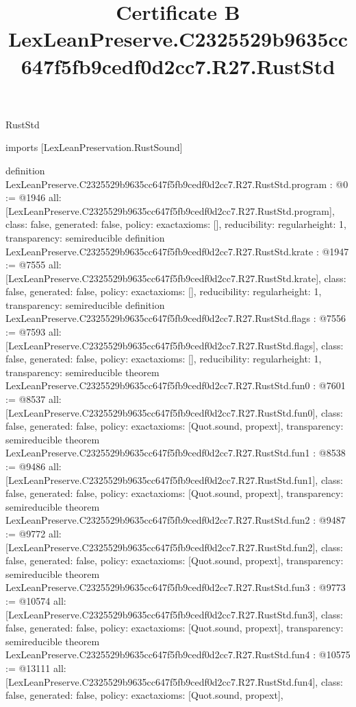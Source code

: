 \begin{lexlean}{RustStd}
\title{Certificate B LexLeanPreserve.C2325529b9635cc647f5fb9cedf0d2cc7.R27.RustStd}
\begin{coremodule}
imports [LexLeanPreservation.RustSound]

definition LexLeanPreserve.C2325529b9635cc647f5fb9cedf0d2cc7.R27.RustStd.program : @0 := @1946 {
  all: [LexLeanPreserve.C2325529b9635cc647f5fb9cedf0d2cc7.R27.RustStd.program],
  class: false,
  generated: false,
  policy: exact{axioms: []},
  reducibility: regular{height: 1},
  transparency: semireducible
}
definition LexLeanPreserve.C2325529b9635cc647f5fb9cedf0d2cc7.R27.RustStd.krate : @1947 := @7555 {
  all: [LexLeanPreserve.C2325529b9635cc647f5fb9cedf0d2cc7.R27.RustStd.krate],
  class: false,
  generated: false,
  policy: exact{axioms: []},
  reducibility: regular{height: 1},
  transparency: semireducible
}
definition LexLeanPreserve.C2325529b9635cc647f5fb9cedf0d2cc7.R27.RustStd.flags : @7556 := @7593 {
  all: [LexLeanPreserve.C2325529b9635cc647f5fb9cedf0d2cc7.R27.RustStd.flags],
  class: false,
  generated: false,
  policy: exact{axioms: []},
  reducibility: regular{height: 1},
  transparency: semireducible
}
theorem LexLeanPreserve.C2325529b9635cc647f5fb9cedf0d2cc7.R27.RustStd.fun0 : @7601 := @8537 {
  all: [LexLeanPreserve.C2325529b9635cc647f5fb9cedf0d2cc7.R27.RustStd.fun0],
  class: false,
  generated: false,
  policy: exact{axioms: [Quot.sound, propext]},
  transparency: semireducible
}
theorem LexLeanPreserve.C2325529b9635cc647f5fb9cedf0d2cc7.R27.RustStd.fun1 : @8538 := @9486 {
  all: [LexLeanPreserve.C2325529b9635cc647f5fb9cedf0d2cc7.R27.RustStd.fun1],
  class: false,
  generated: false,
  policy: exact{axioms: [Quot.sound, propext]},
  transparency: semireducible
}
theorem LexLeanPreserve.C2325529b9635cc647f5fb9cedf0d2cc7.R27.RustStd.fun2 : @9487 := @9772 {
  all: [LexLeanPreserve.C2325529b9635cc647f5fb9cedf0d2cc7.R27.RustStd.fun2],
  class: false,
  generated: false,
  policy: exact{axioms: [Quot.sound, propext]},
  transparency: semireducible
}
theorem LexLeanPreserve.C2325529b9635cc647f5fb9cedf0d2cc7.R27.RustStd.fun3 : @9773 := @10574 {
  all: [LexLeanPreserve.C2325529b9635cc647f5fb9cedf0d2cc7.R27.RustStd.fun3],
  class: false,
  generated: false,
  policy: exact{axioms: [Quot.sound, propext]},
  transparency: semireducible
}
theorem LexLeanPreserve.C2325529b9635cc647f5fb9cedf0d2cc7.R27.RustStd.fun4 : @10575 := @13111 {
  all: [LexLeanPreserve.C2325529b9635cc647f5fb9cedf0d2cc7.R27.RustStd.fun4],
  class: false,
  generated: false,
  policy: exact{axioms: [Quot.sound, propext]},
}
\end{coremodule}
\end{lexlean}
